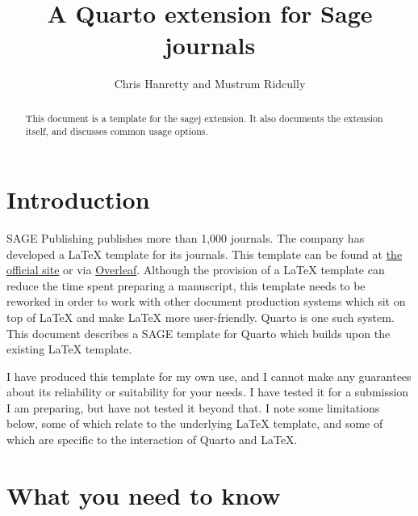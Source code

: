 \documentclass[
  Review,
  times,
  sageh]{sagej}
\title{A Quarto extension for Sage journals}
\author{Chris Hanretty\affilnum{1} and Mustrum Ridcully\affilnum{2}}
\affiliation{
    \affilnum{1} Royal Holloway, University of London, Department of
Politics, International Relations and Philosophy \\
    \affilnum{2} Unseen University, Arch-Chancellory \\
  }
\begin{document}
\maketitle


\maketitle
\begin{abstract}
This document is a template for the sagej extension. It also documents
the extension itself, and discusses common usage options.
\end{abstract}

\ifdefined\Shaded\renewenvironment{Shaded}{\begin{tcolorbox}[breakable, borderline west={3pt}{0pt}{shadecolor}, sharp corners, boxrule=0pt, interior hidden, enhanced, frame hidden]}{\end{tcolorbox}}\fi

\hypertarget{sec-intro}{%
\section{Introduction}\label{sec-intro}}

SAGE Publishing publishes more than 1,000 journals. The company has
developed a \LaTeX{} template for its journals. This template can be
found at
\href{https://uk.sagepub.com/sites/default/files/sage_latex_template_4.zip}{the
official site} or via
\href{https://www.overleaf.com/latex/templates/tagged/sage}{Overleaf}.
Although the provision of a \LaTeX{} template can reduce the time spent
preparing a manuscript, this template needs to be reworked in order to
work with other document production systems which sit on top of \LaTeX{}
and make \LaTeX{} more user-friendly. Quarto is one such system. This
document describes a SAGE template for Quarto which builds upon the
existing \LaTeX{} template.

I have produced this template for my own use, and I cannot make any
guarantees about its reliability or suitability for your needs. I have
tested it for a submission I am preparing, but have not tested it beyond
that. I note some limitations below, some of which relate to the
underlying LaTeX template, and some of which are specific to the
interaction of Quarto and LaTeX.

\hypertarget{what-you-need-to-know}{%
\section{What you need to know}\label{what-you-need-to-know}}
\end{document}
